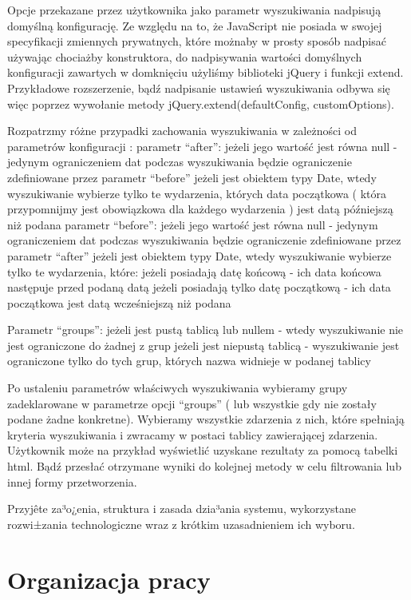 \documentclass[polish,12pt]{aghthesis}
\begin{document}
{Opcje przekazane przez użytkownika jako parametr wyszukiwania nadpisują domyślną konfigurację.
Ze względu na to, że JavaScript nie posiada w swojej specyfikacji zmiennych prywatnych, które  możnaby w prosty sposób nadpisać używając chociażby konstruktora, do nadpisywania wartości domyślnych konfiguracji zawartych w domknięciu użyliśmy biblioteki jQuery i funkcji extend. Przykładowe rozszerzenie, bądź nadpisanie ustawień wyszukiwania odbywa się więc poprzez wywołanie metody jQuery.extend(defaultConfig, customOptions). 

Rozpatrzmy różne przypadki zachowania wyszukiwania w zależności od parametrów konfiguracji :
parametr “after”:
jeżeli jego wartość jest równa null - jedynym ograniczeniem dat podczas wyszukiwania będzie ograniczenie zdefiniowane przez parametr “before”
jeżeli jest obiektem typy Date, wtedy wyszukiwanie wybierze tylko te wydarzenia, których data początkowa ( która przypomnijmy jest obowiązkowa dla każdego wydarzenia ) jest datą późniejszą niż podana
parametr “before”:
jeżeli jego wartość jest równa null - jedynym ograniczeniem dat podczas wyszukiwania będzie ograniczenie zdefiniowane przez parametr “after”
jeżeli jest obiektem typy Date, wtedy wyszukiwanie wybierze tylko te wydarzenia, które:
 jeżeli posiadają datę końcową - ich data końcowa następuje przed podaną datą 
jeżeli posiadają tylko datę początkową - ich data początkowa jest datą wcześniejszą niż podana

Parametr “groups”:
jeżeli jest pustą tablicą lub nullem - wtedy wyszukiwanie nie jest ograniczone do żadnej z grup
jeżeli jest niepustą tablicą - wyszukiwanie jest ograniczone tylko do tych grup, których nazwa widnieje w podanej tablicy

Po ustaleniu parametrów właściwych wyszukiwania wybieramy grupy zadeklarowane w parametrze opcji “groups” ( lub wszystkie gdy nie zostały podane żadne konkretne). Wybieramy wszystkie zdarzenia z nich, które spełniają kryteria wyszukiwania i zwracamy w postaci tablicy zawierającej zdarzenia.
Użytkownik może na przykład wyświetlić uzyskane rezultaty za pomocą tabelki html. Bądź przesłać otrzymane wyniki do kolejnej metody w celu filtrowania lub innej formy przetworzenia. 


Przyjête za³o¿enia, struktura i zasada dzia³ania systemu,
  wykorzystane rozwi±zania technologiczne wraz z krótkim uzasadnieniem
  ich wyboru.}

\section{Organizacja pracy}
\label{sec:organizacja-pracy}
\end{document}
